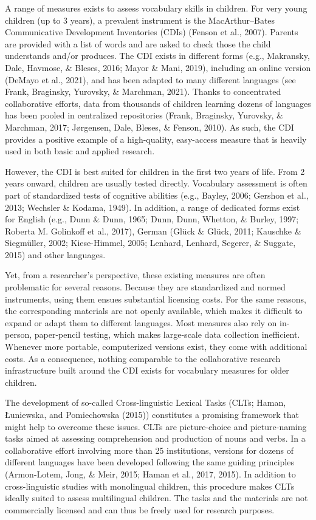 \documentclass[
  man,floatsintext]{apa6}
\begin{document}
A range of measures exists to assess vocabulary skills in children. For very young children (up to 3 years), a prevalent instrument is the MacArthur--Bates Communicative Development Inventories (CDIs) (Fenson et al., 2007). Parents are provided with a list of words and are asked to check those the child understands and/or produces. The CDI exists in different forms (e.g., Makransky, Dale, Havmose, \& Bleses, 2016; Mayor \& Mani, 2019), including an online version (DeMayo et al., 2021), and has been adapted to many different languages (see Frank, Braginsky, Yurovsky, \& Marchman, 2021). Thanks to concentrated collaborative efforts, data from thousands of children learning dozens of languages has been pooled in centralized repositories (Frank, Braginsky, Yurovsky, \& Marchman, 2017; Jørgensen, Dale, Bleses, \& Fenson, 2010). As such, the CDI provides a positive example of a high-quality, easy-access measure that is heavily used in both basic and applied research.

However, the CDI is best suited for children in the first two years of life. From 2 years onward, children are usually tested directly. Vocabulary assessment is often part of standardized tests of cognitive abilities (e.g., Bayley, 2006; Gershon et al., 2013; Wechsler \& Kodama, 1949). In addition, a range of dedicated forms exist for English (e.g., Dunn \& Dunn, 1965; Dunn, Dunn, Whetton, \& Burley, 1997; Roberta M. Golinkoff et al., 2017), German (Glück \& Glück, 2011; Kauschke \& Siegmüller, 2002; Kiese-Himmel, 2005; Lenhard, Lenhard, Segerer, \& Suggate, 2015) and other languages.

Yet, from a researcher's perspective, these existing measures are often problematic for several reasons. Because they are standardized and normed instruments, using them ensues substantial licensing costs. For the same reasons, the corresponding materials are not openly available, which makes it difficult to expand or adapt them to different languages. Most measures also rely on in-person, paper-pencil testing, which makes large-scale data collection inefficient. Whenever more portable, computerized versions exist, they come with additional costs. As a consequence, nothing comparable to the collaborative research infrastructure built around the CDI exists for vocabulary measures for older children.

The development of so-called Cross-linguistic Lexical Tasks (CLTs; Haman, Łuniewska, and Pomiechowska (2015)) constitutes a promising framework that might help to overcome these issues. CLTs are picture-choice and picture-naming tasks aimed at assessing comprehension and production of nouns and verbs. In a collaborative effort involving more than 25 institutions, versions for dozens of different languages have been developed following the same guiding principles (Armon-Lotem, Jong, \& Meir, 2015; Haman et al., 2017, 2015). In addition to cross-linguistic studies with monolingual children, this procedure makes CLTs ideally suited to assess multilingual children. The tasks and the materials are not commercially licensed and can thus be freely used for research purposes.
\end{document}
